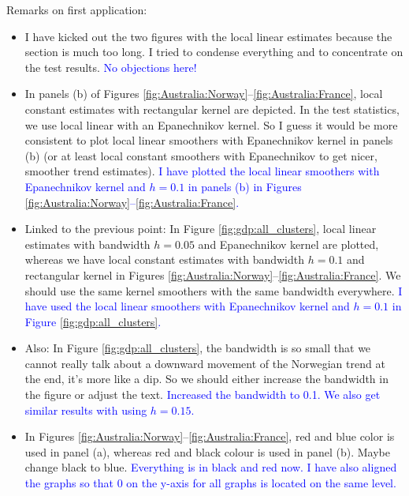 \documentclass[a4paper,12pt]{article}
\makeatletter
\renewcommand{\eqref}[1]{\tagform@{\ref{#1}}}
\makeatother
\begin{document}

\newpage
\FloatBarrier
{\color{red} Remarks on first application: 
\begin{itemize}
\item I have kicked out the two figures with the local linear estimates because the section is much too long. I tried to condense everything and to concentrate on the test results. \textcolor{blue}{No objections here!}
\item In panels (b) of Figures \ref{fig:Australia:Norway}--\ref{fig:Australia:France}, local constant estimates with rectangular kernel are depicted. In the test statistics, we use local linear with an Epanechnikov kernel. So I guess it would be more consistent to plot local linear smoothers with Epanechnikov kernel in panels (b) (or at least local constant smoothers with Epanechnikov to get nicer, smoother trend estimates). \textcolor{blue}{I have plotted the local linear smoothers with Epanechnikov kernel and $h = 0.1$ in panels (b) in Figures \ref{fig:Australia:Norway}--\ref{fig:Australia:France}.}
\item Linked to the previous point: In Figure \ref{fig:gdp:all_clusters}, local linear estimates with bandwidth $h=0.05$ and Epanechnikov kernel are plotted, whereas we have local constant estimates with bandwidth $h=0.1$ and rectangular kernel in Figures \ref{fig:Australia:Norway}--\ref{fig:Australia:France}. We should use the same kernel smoothers with the same bandwidth everywhere.  \textcolor{blue}{I have used the local linear smoothers with Epanechnikov kernel and $h = 0.1$ in Figure \ref{fig:gdp:all_clusters}.}
\item Also: In Figure \ref{fig:gdp:all_clusters}, the bandwidth is so small that we cannot really talk about a downward movement of the Norwegian trend at the end, it's more like a dip. So we should either increase the bandwidth in the figure or adjust the text. \textcolor{blue}{Increased the bandwidth to 0.1.  We also get similar results with using $h = 0.15$.}
\item In Figures \ref{fig:Australia:Norway}--\ref{fig:Australia:France}, red and blue color is used in panel (a), whereas red and black colour is used in panel (b). Maybe change black to blue. \textcolor{blue}{Everything is in black and red now. I have also aligned the graphs so that $0$ on the y-axis for all graphs is located on the same level.}

\end{itemize}}
\end{document}
